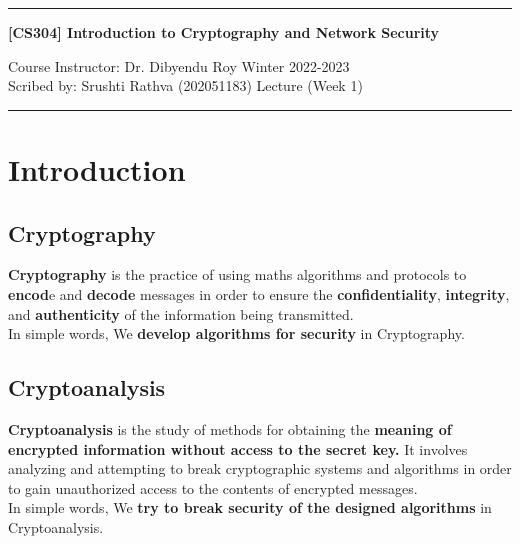 \documentclass[11pt]{article}
\begin{document}
\noindent
\rule{\textwidth}{1pt}
\begin{center}
{\bf [CS304] Introduction to Cryptography and Network Security}
\end{center}
Course Instructor: Dr. Dibyendu Roy \hfill Winter 2022-2023\\
Scribed by: Srushti Rathva (202051183) \hfill Lecture (Week 1)
\\
\rule{\textwidth}{1pt}

\section*{Introduction}
\subsection*{Cryptography}
\textbf{Cryptography} is the practice of using maths algorithms and protocols to \textbf{encod}e and \textbf{decode} messages in order to ensure the \textbf{confidentiality}, \textbf{integrity}, and \textbf{authenticity} of the information being transmitted. \\
In simple words, We \textbf{develop algorithms for security} in Cryptography.

\subsection*{Cryptoanalysis}
\textbf{Cryptoanalysis} is the study of methods for obtaining the \textbf{meaning of encrypted information without access to the secret key.} It involves analyzing and attempting to break cryptographic systems and algorithms in order to gain unauthorized access to the contents of encrypted messages. \\ 
In simple words, We \textbf{try to break security of the designed algorithms} in Cryptoanalysis.
\end{document}
